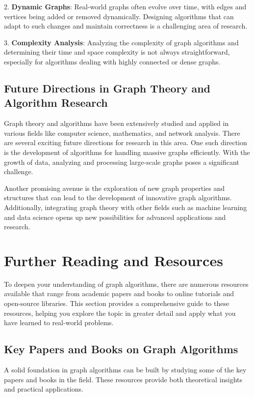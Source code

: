 \documentclass[12pt]{book} %
\begin{document}
2. \textbf{Dynamic Graphs}: Real-world graphs often evolve over time, with edges and vertices being added or removed dynamically. Designing algorithms that can adapt to such changes and maintain correctness is a challenging area of research.

3. \textbf{Complexity Analysis}: Analyzing the complexity of graph algorithms and determining their time and space complexity is not always straightforward, especially for algorithms dealing with highly connected or dense graphs.

\subsection{Future Directions in Graph Theory and Algorithm Research}
Graph theory and algorithms have been extensively studied and applied in various fields like computer science, mathematics, and network analysis. There are several exciting future directions for research in this area. One such direction is the development of algorithms for handling massive graphs efficiently. With the growth of data, analyzing and processing large-scale graphs poses a significant challenge.

Another promising avenue is the exploration of new graph properties and structures that can lead to the development of innovative graph algorithms. Additionally, integrating graph theory with other fields such as machine learning and data science opens up new possibilities for advanced applications and research.


\section{Further Reading and Resources}
To deepen your understanding of graph algorithms, there are numerous resources available that range from academic papers and books to online tutorials and open-source libraries. This section provides a comprehensive guide to these resources, helping you explore the topic in greater detail and apply what you have learned to real-world problems.

\subsection{Key Papers and Books on Graph Algorithms}
A solid foundation in graph algorithms can be built by studying some of the key papers and books in the field. These resources provide both theoretical insights and practical applications.
\end{document}

